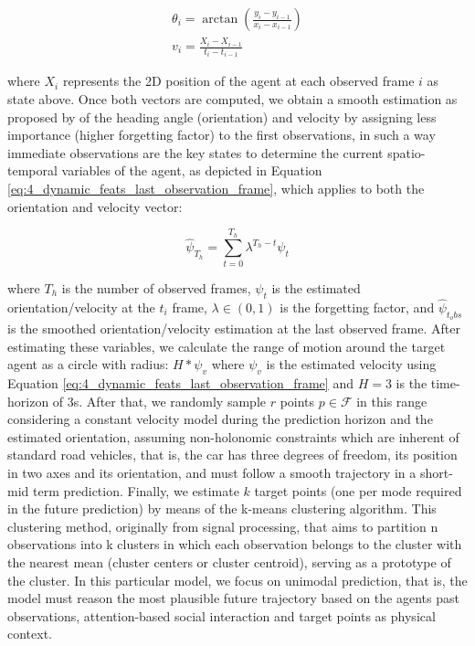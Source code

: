 \begin{equation}
	\begin{split}
		\theta_{i}=\arctan{(\frac{y_{i}-y_{i-1}}{x_{i}-x_{i-1}})} \\
		v_{i}=\frac{X_{i}-X_{i-1}}{t_{i}-t_{i-1}} 
	\end{split}
\end{equation}
 
where $X_{i}$ represents the 2D position of the agent at each observed frame $i$ as state above. Once both vectors are computed, we obtain a smooth estimation as proposed by \cite{tang2021exploring} of the heading angle (orientation) and velocity by assigning less importance (higher forgetting factor) to the first observations, in such a way immediate observations are the key states to determine the current spatio-temporal variables of the agent, as depicted in Equation \ref{eq:4_dynamic_feats_last_observation_frame}, which applies to both the orientation and velocity vector: 

\begin{equation}
	\hat{\psi}_{T_h} = \sum_{t=0}^{T_h}\lambda^{T_h - t}\psi_t
	\label{eq:4_dynamic_feats_last_observation_frame}
\end{equation}

where $T_h$ is the number of observed frames, $\psi_t$ is the estimated orientation/velocity at the $t_{i}$ frame, $\lambda\in(0, 1)$ is the forgetting factor, and $\hat{\psi}_{t_obs}$ is the smoothed orientation/velocity estimation at the last observed frame. After estimating these variables, we calculate the range of motion around the target agent as a circle with radius: $H * \psi_{v}$ where $\psi_{v}$ is the estimated velocity using Equation \ref{eq:4_dynamic_feats_last_observation_frame} and $H=3$ is the time-horizon of 3s. After that, we randomly sample $r$ points $p \in \mathcal{F}$ in this range considering a constant velocity model during the prediction horizon and the estimated orientation, assuming non-holonomic constraints \cite{triggs1993motion} which are inherent of standard road vehicles, that is, the car has three degrees of freedom, its position in two axes and its orientation, and must follow a smooth trajectory in a short-mid term prediction. Finally, we estimate $k$ target points (one per mode required in the future prediction) by means of the k-means \cite{ahmed2020k} clustering algorithm. This clustering method, originally from signal processing, that aims to partition n observations into k clusters in which each observation belongs to the cluster with the nearest mean (cluster centers or cluster centroid), serving as a prototype of the cluster. In this particular model, we focus on unimodal prediction, that is, the model must reason the most plausible future trajectory based on the agents past observations, attention-based social interaction and target points as physical context.

